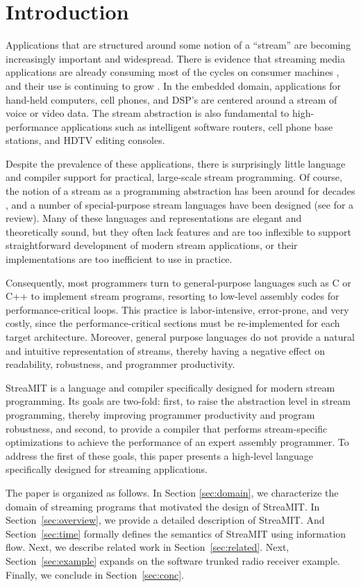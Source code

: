 \section{Introduction}

Applications that are structured around some notion of a ``stream''
are becoming increasingly important and widespread.  There is evidence
that streaming media applications are already consuming most of the
cycles on consumer machines \cite{Rix98}, and their use is continuing
to grow \cite{someone}.  In the embedded domain, applications for
hand-held computers, cell phones, and DSP's are centered around a
stream of voice or video data.  The stream abstraction is also
fundamental to high-performance applications such as intelligent
software routers, cell phone base stations, and HDTV editing consoles.

Despite the prevalence of these applications, there is surprisingly
little language and compiler support for practical, large-scale stream
programming.  Of course, the notion of a stream as a programming
abstraction has been around for decades \cite{SICP}, and a number of
special-purpose stream languages have been designed (see
\cite{survey97} for a review).  Many of these languages and
representations are elegant and theoretically sound, but they often
lack features and are too inflexible to support straightforward
development of modern stream applications, or their implementations
are too inefficient to use in practice.

Consequently, most programmers turn to general-purpose languages such
as C or C++ to implement stream programs, resorting to low-level
assembly codes for performance-critical loops.  This practice is
labor-intensive, error-prone, and very costly, since the
performance-critical sections must be re-implemented for each target
architecture.  Moreover, general purpose languages do not provide a
natural and intuitive representation of streams, thereby having a
negative effect on readability, robustness, and programmer
productivity.

StreaMIT is a language and compiler specifically designed for modern
stream programming.  Its goals are two-fold: first, to raise the
abstraction level in stream programming, thereby improving programmer
productivity and program robustness, and second, to provide a compiler
that performs stream-specific optimizations to achieve the performance
of an expert assembly programmer.  To address the first of these
goals, this paper presents a high-level language specifically designed
for streaming applications.  

The paper is organized as follows. In Section {\ref{sec:domain}}, we
characterize the domain of streaming programs that motivated the
design of StreaMIT.  In Section~\ref{sec:overview}, we provide a
detailed description of StreaMIT. And Section~\ref{sec:time} formally
defines the semantics of StreaMIT using information flow. Next, we
describe related work in Section~\ref{sec:related}.  Next,
Section~\ref{sec:example} expands on the software trunked radio
receiver example. Finally, we conclude in Section~\ref{sec:conc}.


